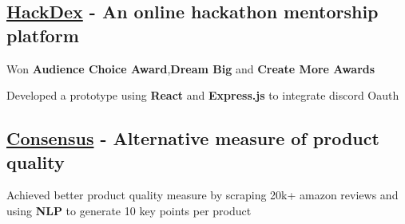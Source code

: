 
\subsection{\href{https://devpost.com/software/hackdex}{HackDex} - An online hackathon mentorship platform}
\begin{zitemize}
    \item Won \textbf{Audience Choice Award},\textbf{Dream Big} and \textbf{Create More Awards}
    \item Developed a prototype using \textbf{React} and \textbf{Express.js} to integrate discord Oauth
\end{zitemize}

\vspace{0.3cm}\subsection{\href{https://devpost.com/software/consensus-qlc9n6}{Consensus} - Alternative measure of product quality}
\begin{zitemize}
    \item Achieved better product quality measure by scraping 20k+ amazon reviews and using \textbf{NLP} to generate 10 key points per product
\end{zitemize}
